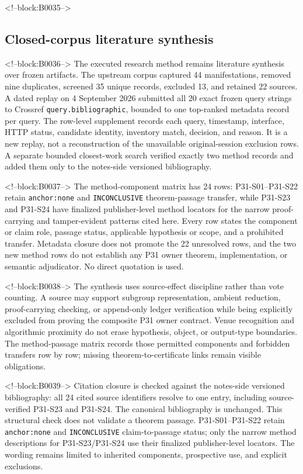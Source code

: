 \documentclass[11pt]{article}
\begin{document}
<!--block:B0035-->
\hypertarget{31-closed-corpus-literature-synthesis}{%
\subsection{Closed-corpus literature
synthesis}\label{31-closed-corpus-literature-synthesis}}

<!--block:B0036-->
The executed research method remains literature synthesis over frozen artifacts.
The upstream corpus captured 44 manifestations, removed nine duplicates, screened
35 unique records, excluded 13, and retained 22 sources.  A dated replay on
4 September 2026 submitted all 20 exact frozen query strings to Crossref
\texttt{query.bibliographic}, bounded to one top-ranked metadata record per query.
The row-level supplement records each query, timestamp, interface, HTTP status,
candidate identity, inventory match, decision, and reason.  It is a new replay,
not a reconstruction of the unavailable original-session exclusion rows.  A
separate bounded closest-work search verified exactly two method records and
added them only to the notes-side versioned bibliography.

<!--block:B0037-->
The method-component matrix has 24 rows: P31-S01--P31-S22 retain
\texttt{anchor:none} and \texttt{INCONCLUSIVE} theorem-passage transfer, while
P31-S23 and P31-S24 have finalized publisher-level method locators for the narrow
proof-carrying and tamper-evident patterns cited here.  Every row states the
component or claim role, passage status, applicable hypothesis or scope, and a
prohibited transfer.  Metadata closure does not promote the 22 unresolved rows,
and the two new method rows do not establish any P31 owner theorem, implementation,
or semantic adjudicator.  No direct quotation is used.

<!--block:B0038-->
The synthesis uses source-effect discipline rather than vote counting.  A source
may support subgroup representation, ambient reduction, proof-carrying checking,
or append-only ledger verification while being explicitly excluded from proving
the composite P31 owner contract.  Venue recognition and algorithmic proximity do
not erase hypothesis, object, or output-type boundaries.  The method-passage
matrix records those permitted components and forbidden transfers row by row;
missing theorem-to-certificate links remain visible obligations.

<!--block:B0039-->
Citation closure is checked against the notes-side versioned bibliography: all
24 cited source identifiers resolve to one entry, including source-verified
P31-S23 and P31-S24.  The canonical bibliography is unchanged.  This structural
check does not validate a theorem passage.  P31-S01--P31-S22 retain
\texttt{anchor:none} and \texttt{INCONCLUSIVE} claim-to-passage status; only the
narrow method descriptions for P31-S23/P31-S24 use their finalized publisher-level
locators.  The wording remains limited to inherited components, prospective use,
and explicit exclusions.
\end{document}
